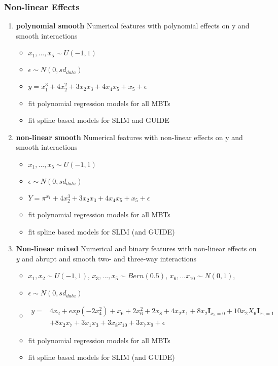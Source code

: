 \subsubsection{Non-linear Effects}
\begin{enumerate}
    \item \textbf{polynomial smooth} Numerical features         with polynomial effects on y and smooth interactions
        \begin{itemize}
            \item $x_1,..., x_5 \sim U(-1,1)$
            \item $\epsilon \sim N(0, sd_{data})$
            \item $ y = x_1^3 + 4   x_2^2 + 3   x_2   x_3 + 4  x_4  x_5 + x_5 + \epsilon$
            \item fit polynomial regression models for all MBTs
            \item fit spline based models for SLIM and GUIDE
           
        \end{itemize}
    \item \textbf{non-linear smooth} Numerical features         with non-linear effects on y and smooth interactions
        \begin{itemize}
            \item $x_1,..., x_5 \sim U(-1,1)$
            \item $\epsilon \sim N(0, sd_{data})$
            \item $ Y = \pi^{x_1} + 4   x_2^3 + 3   x_2   x_3 + 4  x_4  x_5 + x_5 + \epsilon$
            \item fit polynomial regression models for all MBTs
            \item fit spline based models for SLIM (and GUIDE)           
        \end{itemize}
    \item \textbf{Non-linear mixed}
        Numerical and binary features with non-linear effects on $y$ and abrupt and smooth two- and three-way interactions
        \begin{itemize}
            \item $x_1, x_2 \sim U(-1,1)$, $x_3, ..., x_5 \sim Bern(0.5)$, $x_6, ... x_{10} \sim N(0,1)$,  \item $\epsilon \sim N(0, sd_{data})$
            \item \begin{align*}
            y = & 4   x_2 + exp(-2 x_4^2) + x_6 + 2 x_6^2 + 2   x_8 + 4   x_2   x_1 + 8   x_2   \mathbf{I}_{x_3 = 0} + 10   x_2   X_6    \mathbf{I}_{x_5 = 1} \\
            & + 8   x_2   x_7 + 3   x_1   x_3 + 3   x_8   x_{10} + 3   x_7   x_9  + \epsilon  
            \end{align*}
                \item fit polynomial regression models for all MBTs
            \item fit spline based models for SLIM (and GUIDE) 
    
        \end{itemize}
\end{enumerate}




